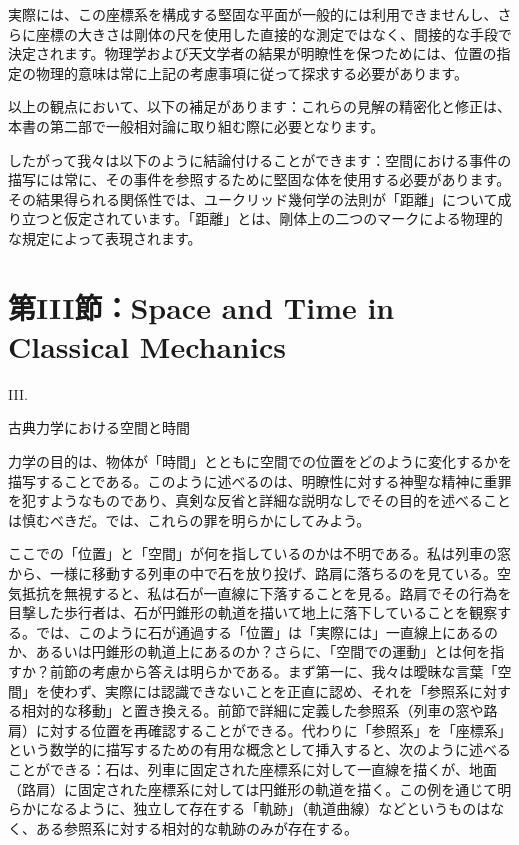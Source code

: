 \documentclass[a4paper,11pt,openany]{ltjsbook}
\begin{document}
実際には、この座標系を構成する堅固な平面が一般的には利用できませんし、さらに座標の大きさは剛体の尺を使用した直接的な測定ではなく、間接的な手段で決定されます。物理学および天文学者の結果が明瞭性を保つためには、位置の指定の物理的意味は常に上記の考慮事項に従って探求する必要があります。

以上の観点において、以下の補足があります：これらの見解の精密化と修正は、本書の第二部で一般相対論に取り組む際に必要となります。

したがって我々は以下のように結論付けることができます：空間における事件の描写には常に、その事件を参照するために堅固な体を使用する必要があります。その結果得られる関係性では、ユークリッド幾何学の法則が「距離」について成り立つと仮定されています。「距離」とは、剛体上の二つのマークによる物理的な規定によって表現されます。


\clearpage
\chapter{第III節：Space and Time in Classical Mechanics}

III.

古典力学における空間と時間

力学の目的は、物体が「時間」とともに空間での位置をどのように変化するかを描写することである。このように述べるのは、明瞭性に対する神聖な精神に重罪を犯すようなものであり、真剣な反省と詳細な説明なしでその目的を述べることは慎むべきだ。では、これらの罪を明らかにしてみよう。

ここでの「位置」と「空間」が何を指しているのかは不明である。私は列車の窓から、一様に移動する列車の中で石を放り投げ、路肩に落ちるのを見ている。空気抵抗を無視すると、私は石が一直線に下落することを見る。路肩でその行為を目撃した歩行者は、石が円錐形の軌道を描いて地上に落下していることを観察する。では、このように石が通過する「位置」は「実際には」一直線上にあるのか、あるいは円錐形の軌道上にあるのか？さらに、「空間での運動」とは何を指すか？前節の考慮から答えは明らかである。まず第一に、我々は曖昧な言葉「空間」を使わず、実際には認識できないことを正直に認め、それを「参照系に対する相対的な移動」と置き換える。前節で詳細に定義した参照系（列車の窓や路肩）に対する位置を再確認することができる。代わりに「参照系」を「座標系」という数学的に描写するための有用な概念として挿入すると、次のように述べることができる：石は、列車に固定された座標系に対して一直線を描くが、地面（路肩）に固定された座標系に対しては円錐形の軌道を描く。この例を通じて明らかになるように、独立して存在する「軌跡」（軌道曲線）などというものはなく、ある参照系に対する相対的な軌跡のみが存在する。
\end{document}
